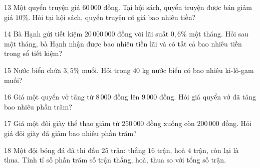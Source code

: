 \gap
\begin{probbox}{13}{\relax}
Một quyển truyện giá $60\,000$ đồng. Tại hội sách, quyển truyện được bán giảm giá $10\%$. Hỏi tại hội sách, quyển truyện có giá bao nhiêu tiền?
\end{probbox}
\gap
\begin{probbox}{14}{\relax}
Bà Hạnh gửi tiết kiệm $20\,000\,000$ đồng với lãi suất $0{,}6\%$ một tháng. Hỏi sau một tháng, bà Hạnh nhận được bao nhiêu tiền lãi và có tất cả bao nhiêu tiền trong sổ tiết kiệm?
\end{probbox}
\gap
\begin{probbox}{15}{\relax}
Nước biển chứa $3{,}5\%$ muối. Hỏi trong $40$ kg nước biển có bao nhiêu ki-lô-gam muối?
\end{probbox}
\gap
\begin{probbox}{16}{\relax}
Giá một quyển vở tăng từ $8\,000$ đồng lên $9\,000$ đồng. Hỏi giá quyển vở đã tăng bao nhiêu phần trăm?
\end{probbox}
\gap
\begin{probbox}{17}{\relax}
Giá một đôi giày thể thao giảm từ $250\,000$ đồng xuống còn $200\,000$ đồng. Hỏi giá đôi giày đã giảm bao nhiêu phần trăm?
\end{probbox}
\gap
\begin{probbox}{18}{\relax}
Một đội bóng đá đã thi đấu $25$ trận: thắng $16$ trận, hoà $4$ trận, còn lại là thua. Tính tỉ số phần trăm số trận thắng, hoà, thua so với tổng số trận.
\end{probbox}
